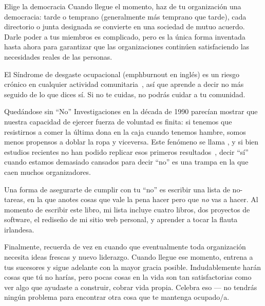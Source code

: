\begin{aside}{Elige la democracia}
  Cuando llegue el momento,
  haz de tu organización una democracia:
  tarde o temprano (generalmente más temprano que tarde),
  cada directorio o junta designada se convierte en una sociedad de mutuo acuerdo.
  Darle poder a tus miembros es complicado,
  pero es la única forma inventada hasta ahora para garantizar
  que las organizaciones continúen satisfaciendo las necesidades reales de las personas.
\end{aside}


El Síndrome de desgaste ocupacional (emph{burnout} en inglés) es un riesgo crónico en cualquier actividad comunitaria~\cite{Pign2016},
así que aprende a decir no más seguido de lo que dices sí.
Si no te cuidas,
no podrás cuidar a tu comunidad.

\begin{aside}{Quedándose sin ``No''}
  Investigaciones en la década de 1990 parecían mostrar que nuestra capacidad de ejercer fuerza de voluntad es finita:
  si tenemos que resistirnos a comer la última dona en la caja cuando tenemos hambre,
  somos menos propensos a doblar la ropa y viceversa.
  Este fenómeno se llama ,
  y si bien estudios recientes no han podido replicar esos primeros resultados~\cite{Hagg2016},
  decir ``sí'' cuando estamos demasiado cansados para decir ``no''
  es una trampa en la que caen muchos organizadores.
\end{aside}

Una forma de asegurarte de cumplir con tu ``no''
es escribir una lista de no-tareas, en la que anotes cosas que vale la pena hacer
pero que \emph{no} vas a hacer.
Al momento de escribir este libro, mi lista incluye cuatro libros,
dos proyectos de software,
el rediseño de mi sitio web personal,
y aprender a tocar la flauta irlandesa. 

Finalmente,
recuerda de vez en cuando que
eventualmente toda organización necesita ideas frescas y nuevo liderazgo.
Cuando llegue ese momento,
entrena a tus sucesores y sigue adelante con la mayor gracia posible.
Indudablemente harán cosas que tú no harías,
pero pocas cosas en la vida son tan satisfactorias como 
ver algo que ayudaste a construir, cobrar vida propia.
Celebra eso --- no tendrás ningún problema para encontrar otra cosa que te mantenga ocupado/a.


